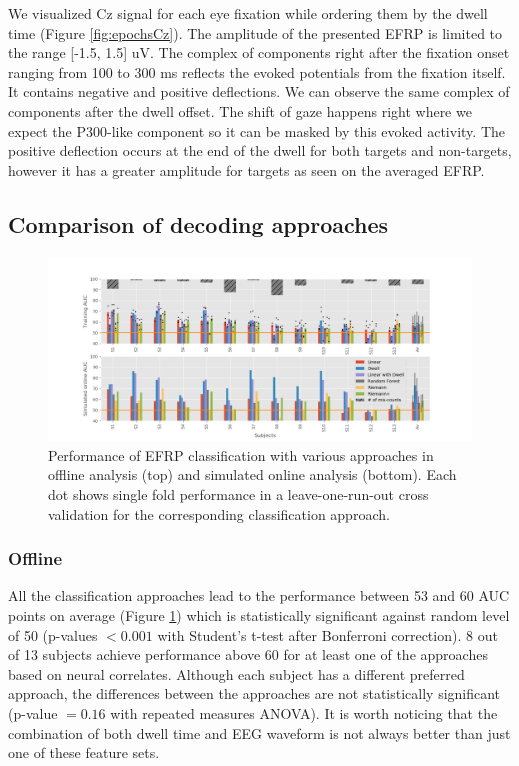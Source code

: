 \documentclass[12pt]{iopart}
\begin{document}
We visualized Cz signal for each eye fixation while ordering them
by the dwell time (Figure \ref{fig:epochsCz}).
The amplitude of the presented EFRP is limited to the range [-1.5, 1.5] uV.
The complex of components right after the fixation onset ranging from 100 to 300 ms
reflects the evoked potentials from the fixation itself. It contains
negative and positive deflections. We can observe the same complex of components
after the dwell offset. The shift of gaze happens right where we expect 
the P300-like component so it can be masked by this evoked activity.
The positive deflection occurs at the end of the dwell for both
targets and non-targets, however it has a greater amplitude for targets
as seen on the averaged EFRP.


\subsection{Comparison of decoding approaches}

\begin{figure}[!t]
    \includegraphics[trim={2cm 0cm 2cm 0cm},clip,width=1.1\columnwidth]{../images/ClassificationAll.png}
    \caption{Performance of EFRP classification with various approaches in offline analysis (top)
    and simulated online analysis (bottom). Each dot shows single fold performance
    in a leave-one-run-out cross validation for the corresponding classification approach.}
\label{fig:classAll}
\end{figure}

\subsubsection*{Offline}
All the classification approaches lead to the performance between 53 and 60 AUC points on average
(Figure \ref{fig:classAll})
which is statistically significant against random level of 50 
(p-values $< 0.001$ with Student's t-test after Bonferroni correction).
8 out of 13 subjects achieve performance above 60 for at least one of the approaches based
on neural correlates.
Although each subject has a different preferred approach, the differences between
the approaches are not statistically significant (p-value $= 0.16$ with repeated measures ANOVA).
It is worth noticing that the combination of both dwell time and EEG waveform is not always
better than just one of these feature sets.
\end{document}
